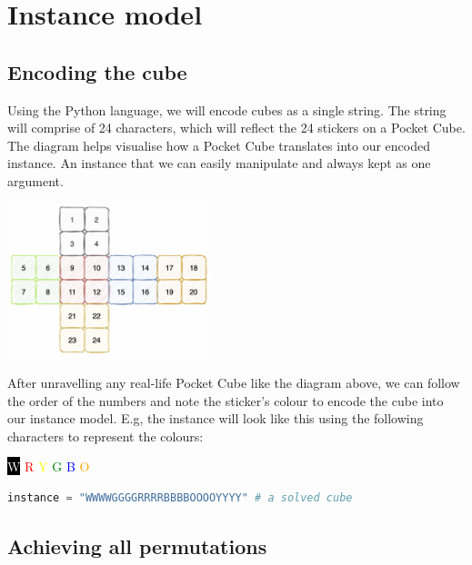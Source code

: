 \documentclass[a4paper]{article}
\begin{document}
\section{Instance model}\label{sec:instance}
\subsection{Encoding the cube}
\par Using the Python language, we will encode cubes as a single string. The string will comprise of 24 characters, which will reflect the 24 stickers on a Pocket Cube. The diagram helps visualise how a Pocket Cube translates into our encoded instance. An instance that we can easily manipulate and always kept as one argument.

\begin{center}
\includegraphics[width=5.9cm]{encoded.png}
\end{center}

\newpage

\par After unravelling any real-life Pocket Cube like the diagram above, we can follow the order of the numbers and note the sticker’s colour to encode the cube into our instance model. E.g, the instance will look like this using the following characters to represent the colours:

\begin{center}
\colorbox{black}{\textcolor{white}{W}}
\textcolor{red}{R}
\textcolor{yellow}{Y}
\textcolor{green}{G}
\textcolor{blue}{B}
\textcolor{orange}{O}
\end{center}

\begin{lstlisting}[language=Python]
instance = "WWWWGGGGRRRRBBBBOOOOYYYY" # a solved cube
\end{lstlisting}

\subsection{Achieving all permutations}
\label{permutations}
\end{document}
